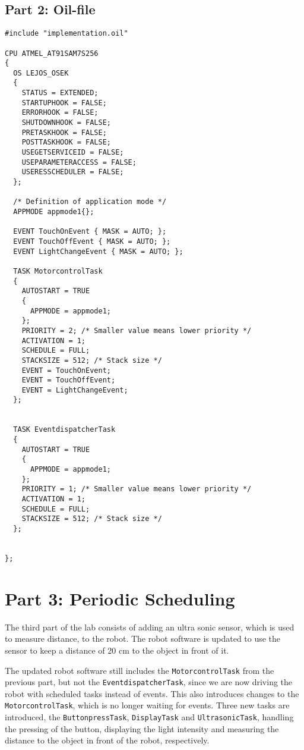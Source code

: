 \documentclass[a4paper,10pt]{report}
\begin{document}
\subsection*{Part 2: Oil-file}

\begin{lstlisting}[label=some-code,caption=part2.oil,mathescape]
#include "implementation.oil"

CPU ATMEL_AT91SAM7S256
{
  OS LEJOS_OSEK
  {
    STATUS = EXTENDED;
    STARTUPHOOK = FALSE;
    ERRORHOOK = FALSE;
    SHUTDOWNHOOK = FALSE;
    PRETASKHOOK = FALSE;
    POSTTASKHOOK = FALSE;
    USEGETSERVICEID = FALSE;
    USEPARAMETERACCESS = FALSE;
    USERESSCHEDULER = FALSE;
  };

  /* Definition of application mode */
  APPMODE appmode1{};

  EVENT TouchOnEvent { MASK = AUTO; };
  EVENT TouchOffEvent { MASK = AUTO; };
  EVENT LightChangeEvent { MASK = AUTO; };	

  TASK MotorcontrolTask
  {
    AUTOSTART = TRUE
    {
      APPMODE = appmode1;
    };
    PRIORITY = 2; /* Smaller value means lower priority */
    ACTIVATION = 1;
    SCHEDULE = FULL;
    STACKSIZE = 512; /* Stack size */
    EVENT = TouchOnEvent;
    EVENT = TouchOffEvent;
    EVENT = LightChangeEvent;
  };


  TASK EventdispatcherTask 
  {
    AUTOSTART = TRUE
    {
      APPMODE = appmode1;
    };
    PRIORITY = 1; /* Smaller value means lower priority */
    ACTIVATION = 1;
    SCHEDULE = FULL;
    STACKSIZE = 512; /* Stack size */
  };


};

\end{lstlisting}
\newpage

\section*{Part 3: Periodic Scheduling}

The third part of the lab consists of adding an ultra sonic sensor, which is used to measure distance, to the robot. The robot software is updated to use the sensor to keep a distance of 20 cm to the object in front of it.

The updated robot software still includes the \texttt{MotorcontrolTask} from the previous part, but not the \texttt{EventdispatcherTask}, since we are now driving the robot with scheduled tasks instead of events. This also introduces changes to the \texttt{MotorcontrolTask}, which is no longer waiting for events. Three new tasks are introduced, the \texttt{ButtonpressTask}, \texttt{DisplayTask} and \texttt{UltrasonicTask}, handling the pressing of the button, displaying the light intensity and measuring the distance to the object in front of the robot, respectively.
\end{document}
